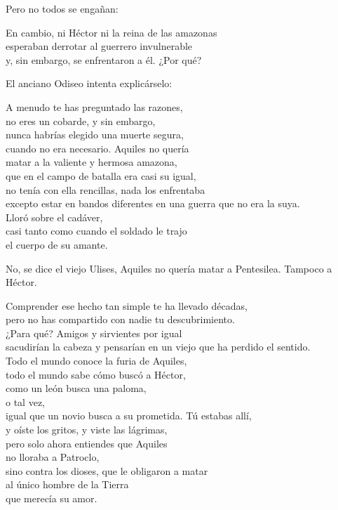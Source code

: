 Pero no todos se engañan:

\begin{versopropio}
En cambio, ni Héctor ni la reina de las amazonas\\
esperaban derrotar al guerrero invulnerable\\
y, sin embargo, se enfrentaron a él. ¿Por qué?
\end{versopropio}

El anciano Odiseo intenta explicárselo:

\begin{versopropio}
A menudo te has preguntado las razones,\\
no eres un cobarde, y sin embargo,\\
nunca habrías elegido una muerte segura,\\
cuando no era necesario. Aquiles no quería\\
matar a la valiente y hermosa amazona,\\
que en el campo de batalla era casi su igual,\\
no tenía con ella rencillas, nada los enfrentaba\\
excepto estar en bandos diferentes en una guerra que no era la suya.\\
Lloró sobre el cadáver,\\
casi tanto como cuando el soldado le trajo\\
el cuerpo de su amante.
\end{versopropio}

No, se dice el viejo Ulises, Aquiles no quería matar a Pentesilea. Tampoco a Héctor.

\begin{versopropio}
Comprender ese hecho tan simple te ha llevado décadas,\\
pero no has compartido con nadie tu descubrimiento.\\
¿Para qué? Amigos y sirvientes por igual\\
sacudirían la cabeza y pensarían en un viejo que ha perdido el sentido.\\
Todo el mundo conoce la furia de Aquiles,\\
todo el mundo sabe cómo buscó a Héctor,\\
como un león busca una paloma,\\
o tal vez,\\
igual que un novio busca a su prometida. Tú estabas allí,\\
y oíste los gritos, y viste las lágrimas,\\
pero solo ahora entiendes que Aquiles\\
no lloraba a Patroclo,\\
sino contra los dioses, que le obligaron a matar\\
al único hombre de la Tierra\\
que merecía su amor.
\end{versopropio}

